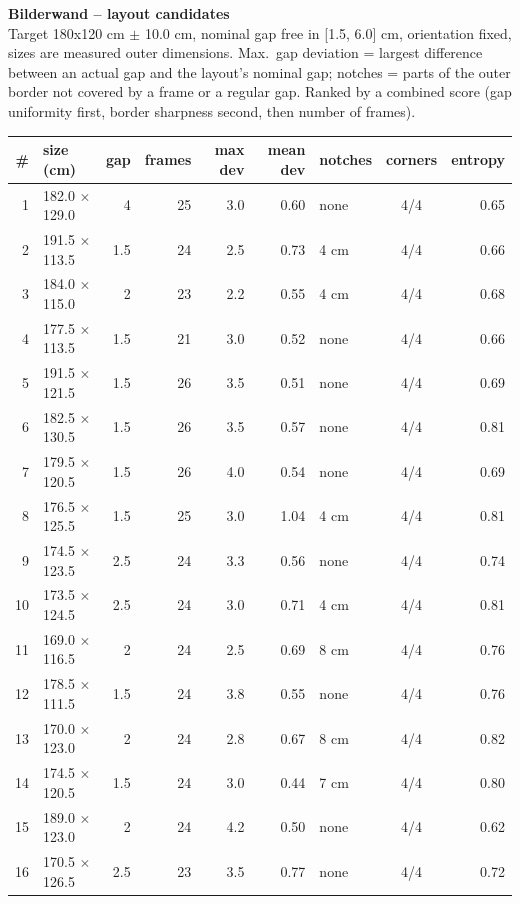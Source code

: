 \documentclass[a4paper,landscape,10pt]{article}
\begin{document}
{\LARGE\bfseries Bilderwand -- layout candidates}\\[4pt]
{\small Target 180x120 cm $\pm$ 10.0 cm, nominal gap free in
[1.5, 6.0] cm, orientation fixed, sizes are measured outer dimensions.
Max.\ gap deviation = largest difference between an actual gap and the layout's nominal gap;
notches = parts of the outer border not covered by a frame or a regular gap. Ranked by a combined
score (gap uniformity first, border sharpness second, then number of frames).}\\[10pt]
\begin{minipage}[t]{0.6\textwidth}\vspace{0pt}
\begin{tabular}{@{}r l r r r r l c r@{}}
\toprule
\# & size (cm) & gap & frames & max dev & mean dev & notches & corners & entropy \\
\midrule
1 & 182.0 $\times$ 129.0 & 4 & 25 & 3.0 & 0.60 & none & 4/4 & 0.65 \\
2 & 191.5 $\times$ 113.5 & 1.5 & 24 & 2.5 & 0.73 & 4 cm & 4/4 & 0.66 \\
3 & 184.0 $\times$ 115.0 & 2 & 23 & 2.2 & 0.55 & 4 cm & 4/4 & 0.68 \\
4 & 177.5 $\times$ 113.5 & 1.5 & 21 & 3.0 & 0.52 & none & 4/4 & 0.66 \\
5 & 191.5 $\times$ 121.5 & 1.5 & 26 & 3.5 & 0.51 & none & 4/4 & 0.69 \\
6 & 182.5 $\times$ 130.5 & 1.5 & 26 & 3.5 & 0.57 & none & 4/4 & 0.81 \\
7 & 179.5 $\times$ 120.5 & 1.5 & 26 & 4.0 & 0.54 & none & 4/4 & 0.69 \\
8 & 176.5 $\times$ 125.5 & 1.5 & 25 & 3.0 & 1.04 & 4 cm & 4/4 & 0.81 \\
9 & 174.5 $\times$ 123.5 & 2.5 & 24 & 3.3 & 0.56 & none & 4/4 & 0.74 \\
10 & 173.5 $\times$ 124.5 & 2.5 & 24 & 3.0 & 0.71 & 4 cm & 4/4 & 0.81 \\
11 & 169.0 $\times$ 116.5 & 2 & 24 & 2.5 & 0.69 & 8 cm & 4/4 & 0.76 \\
12 & 178.5 $\times$ 111.5 & 1.5 & 24 & 3.8 & 0.55 & none & 4/4 & 0.76 \\
13 & 170.0 $\times$ 123.0 & 2 & 24 & 2.8 & 0.67 & 8 cm & 4/4 & 0.82 \\
14 & 174.5 $\times$ 120.5 & 1.5 & 24 & 3.0 & 0.44 & 7 cm & 4/4 & 0.80 \\
15 & 189.0 $\times$ 123.0 & 2 & 24 & 4.2 & 0.50 & none & 4/4 & 0.62 \\
16 & 170.5 $\times$ 126.5 & 2.5 & 23 & 3.5 & 0.77 & none & 4/4 & 0.72 \\
\bottomrule
\end{tabular}
\end{minipage}\hfill
\end{document}
